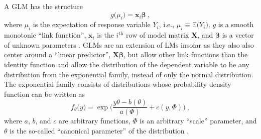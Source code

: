 A GLM has the structure
\begin{equation}
  \label{eq:GeneralizedLinearModel}
  g\bigl(\mu_i\bigr) = \symbf{x}_i \symbf{\beta}~,  %
\end{equation}
where \(\mu_i\) is the expectation of response variable \(Y_i\), i.e., \(\mu_i \equiv \mathbb{E}\bigl(Y_i\bigr)\), \(g\) is a smooth monotonic ``link function'', \(\symbf{x}_i\) is the \(i^{\text{th}}\) row of model matrix \(\symbf{X}\), and \(\symbf{\beta}\) is a vector of unknown parameters \parencite{Wood2006,Nelder1972}.
GLMs are an extension of LMs insofar as they also also center around a ``linear predictor'', \(\symbf{X}\symbf{\beta}\), but allow other link functions than the identity function and allow the distribution of the dependent variable to be any distribution from the exponential family, instead of only the normal distribution.  The exponential family consists of distributions whose probability density function can be written as
\begin{equation}
  \label{eq:ExponentialFamilyProbabilityDensityFunction}
  f_{\theta}\bigl(y\bigr) = \exp \bigg( \frac{y \theta - b(\theta)}{a(\Phi)} + c(y, \Phi)\bigg)~,
\end{equation}
where \(a\), \(b\), and \(c\) are arbitrary functions, \(\Phi\) is an arbitrary ``scale'' parameter, and \(\theta\) is the so-called ``canonical parameter'' of the distribution \parencite{Wood2006}.

